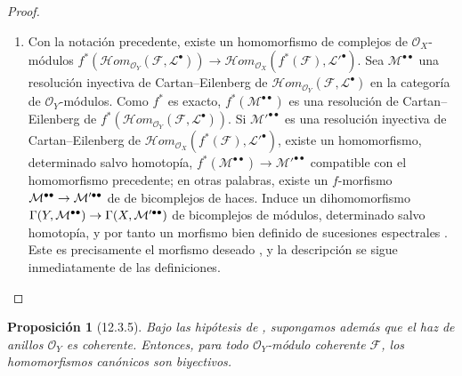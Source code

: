 \documentclass[10pt,oneside,openany]{book}
\theoremstyle{egaenv}\newtheorem*{env}{---}
\theoremstyle{egastatement}
\newtheorem*{proposition}{Proposición}
\theoremstyle{egadescription}
\renewcommand{\to}{\mathchoice{\longrightarrow}{\rightarrow}{\rightarrow}{\rightarrow}}
\begin{document}
\begin{proof}
\begin{enumerate}
  \item[\rm(ii)]
  Con la notación precedente, existe un homomorfismo de complejos de
  $\mathcal O_X$-módulos
  $f^*(\mathcal{H}om_{\mathcal O_Y}(\mathcal F,\mathcal L^\bullet))\longrightarrow\mathcal{H}om_{\mathcal O_X}(f^*(\mathcal F),\mathcal L'^\bullet)$.
  Sea $\mathcal M^{\bullet\bullet}$ una resolución inyectiva de
  Cartan--Eilenberg de
  $\mathcal{H}om_{\mathcal O_Y}(\mathcal F,\mathcal L^\bullet)$ en la categoría de
  $\mathcal O_Y$-módulos.  Como $f^*$ es exacto,
  $f^*(\mathcal M^{\bullet\bullet})$ es una resolución de Cartan--Eilenberg de
  $f^*(\mathcal{H}om_{\mathcal O_Y}(\mathcal F,\mathcal L^\bullet))$.
  Si $\mathcal M'^{\bullet\bullet}$ es una resolución inyectiva de
  Cartan--Eilenberg de
  $\mathcal{H}om_{\mathcal O_X}(f^*(\mathcal F),\mathcal L'^\bullet)$, existe
   un homomorfismo, determinado salvo homotopía,
  $f^*(\mathcal M^{\bullet\bullet})\longrightarrow\mathcal M'^{\bullet\bullet}$
  compatible con el homomorfismo precedente; en otras palabras, existe
  un $f$-morfismo
  $\mathcal M^{\bullet\bullet}\to
\mathcal M'^{\bullet\bullet}$ de
  de bicomplejos de haces.
  Induce un dihomomorfismo
  $\Gamma(Y,\mathcal M^{\bullet\bullet})\to
\Gamma(X,\mathcal M'^{\bullet\bullet})$
  de bicomplejos de módulos, determinado salvo homotopía, y por tanto
  un morfismo bien definido de sucesiones espectrales
  .  Este es precisamente el morfismo deseado
  , y la descripción
   se sigue inmediatamente de las definiciones.
\end{enumerate}
\end{proof}

\begin{proposition}[12.3.5]
\label{0.12.3.5}
\label{0.12.3.5-fr}
Bajo las hipótesis de , supongamos además que el
haz de anillos $\mathcal O_Y$ es coherente.
Entonces, para todo $\mathcal O_Y$-módulo coherente $\mathcal F$, los
homomorfismos canónicos  son biyectivos.
\end{proposition}
\end{document}
